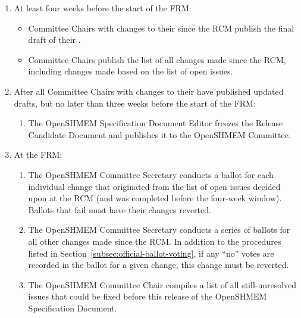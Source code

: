 \begin{enumerate}
\item At least four weeks before the start of the FRM:
  \begin{itemize}
  \item {} Committee Chairs with changes to their  since
    the RCM publish the final draft of their .
  \item {} Committee Chairs publish the list of all
    changes made since the RCM, including changes made based on the
    list of open issues.
  \end{itemize}

\item After all  Committee Chairs with changes to their
   have published updated  drafts, but no later than
  three weeks before the start of the FRM:
  \begin{enumerate}
  \item The OpenSHMEM Specification Document Editor freezes the Release Candidate
    Document and publishes it to the OpenSHMEM Committee.
  \end{enumerate}

\item At the FRM:
  \begin{enumerate}
  \item The OpenSHMEM Committee Secretary conducts a ballot for each individual
    change that originated from the list of open issues decided upon
    at the RCM (and was completed before the four-week window).
    Ballots that fail must have their changes reverted.
  \item\label{voting:slow-track-end} The OpenSHMEM Committee Secretary conducts
    a series of ballots for all other changes made since the RCM.  In
    addition to the procedures listed in
    Section~\ref{subsec:official-ballot-voting}, if any ``no'' votes
    are recorded in the ballot for a given change, this change must be
    reverted.
  \item\label{voting:fast-track-begin} The OpenSHMEM Committee Chair compiles a
    list of all still-unresolved issues that could be fixed before
    this release of the OpenSHMEM Specification Document.


\end{enumerate}
\end{enumerate}
